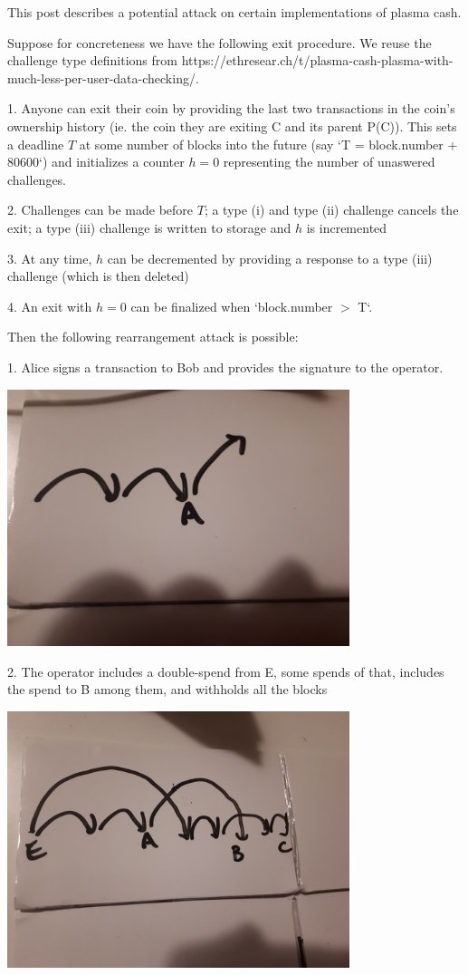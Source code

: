 \documentclass{article}
\begin{document}
This post describes a potential attack on certain implementations of plasma cash.

Suppose for concreteness we have the following exit procedure. We reuse the challenge type definitions from https://ethresear.ch/t/plasma-cash-plasma-with-much-less-per-user-data-checking/.

1. Anyone can exit their coin by providing the last two transactions in the coin’s ownership history (ie. the coin they are exiting C and its parent P(C)). This sets a deadline $T$ at some number of blocks into the future (say `T = block.number + 80600`) and initializes a counter $h = 0$ representing the number of unaswered challenges.

2. Challenges can be made before $T$; a type (i) and type (ii) challenge cancels the exit; a type (iii) challenge is written to storage and $h$ is incremented

3. At any time, $h$ can be decremented by providing a response to a type (iii) challenge (which is then deleted)

4. An exit with $h = 0$ can be finalized when `block.number $>$ T`.

Then the following rearrangement attack is possible:

1. Alice signs a transaction to Bob and provides the signature to the operator.

\includegraphics[width=10cm]{A.jpeg}

2. The operator includes a double-spend from E, some spends of that, includes the spend to B among them, and withholds all the blocks

\includegraphics[width=10cm]{B.jpeg}
\end{document}
